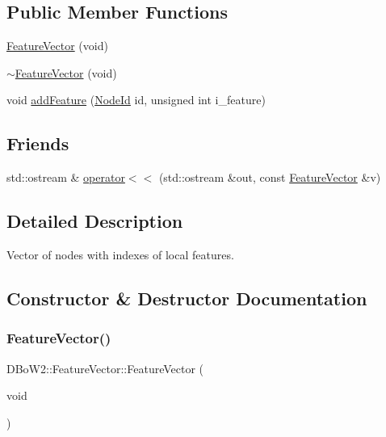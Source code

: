 \subsection*{Public Member Functions}
\begin{DoxyCompactItemize}
\item 
\hyperlink{classDBoW2_1_1FeatureVector_a66c069d269c8c98dcf3ae39cbc6f861b}{Feature\+Vector} (void)
\item 
\hyperlink{classDBoW2_1_1FeatureVector_a44514a020719b7e5ac552332a9922bd9}{$\sim$\+Feature\+Vector} (void)
\item 
void \hyperlink{classDBoW2_1_1FeatureVector_ae9554bfcbebc85439616de08f47f2238}{add\+Feature} (\hyperlink{namespaceDBoW2_a3a0fa9c50c0df508759362d6204566f2}{Node\+Id} id, unsigned int i\+\_\+feature)
\end{DoxyCompactItemize}
\subsection*{Friends}
\begin{DoxyCompactItemize}
\item 
std\+::ostream \& \hyperlink{classDBoW2_1_1FeatureVector_a34aa65c93dc5f6be269610e3f238d9b1}{operator$<$$<$} (std\+::ostream \&out, const \hyperlink{classDBoW2_1_1FeatureVector}{Feature\+Vector} \&v)
\end{DoxyCompactItemize}


\subsection{Detailed Description}
Vector of nodes with indexes of local features. 

\subsection{Constructor \& Destructor Documentation}
\mbox{\label{classDBoW2_1_1FeatureVector_a66c069d269c8c98dcf3ae39cbc6f861b}} 
\subsubsection{\texorpdfstring{Feature\+Vector()}{FeatureVector()}}
{\footnotesize\ttfamily D\+Bo\+W2\+::\+Feature\+Vector\+::\+Feature\+Vector (\begin{DoxyParamCaption}\item[{void}]{ }\end{DoxyParamCaption})}

